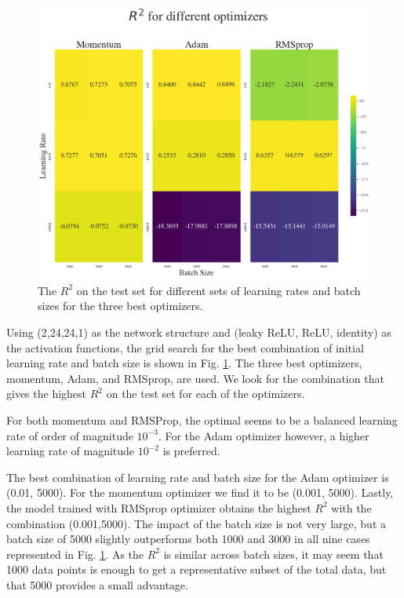 \begin{figure}[h!]
    \centering
    \includegraphics[width=1.0\linewidth]{project_2/figures/r2_grid_final.png}
    \caption{The $R^2$ on the test set for different sets of learning rates and batch sizes for the three best optimizers.}
    \label{fig:grid_franke}
\end{figure}

Using (2,24,24,1) as the network structure and (leaky ReLU, ReLU, identity) as the activation functions, the grid search for the best combination of initial learning rate and batch size is shown in Fig. \ref{fig:grid_franke}. The three best optimizers, momentum, Adam, and RMSprop, are used. 
We look for the combination that gives the highest $R^2$ on the test set for each of the optimizers. 

For both momentum and RMSProp, the optimal seems to be a balanced learning rate of order of magnitude $10^{-3}$.
For the Adam optimizer however, a higher learning rate of magnitude $10^{-2}$ is preferred.

The best combination of learning rate and batch size for the Adam optimizer is (0.01, 5000). For the momentum optimizer we find it to be (0.001, 5000). Lastly, the model trained with RMSprop optimizer obtains the highest $R^2$ with the combination (0.001,5000). 
The impact of the batch size is not very large, but a batch size of 5000 slightly outperforms both 1000 and 3000 in all nine cases represented in Fig. \ref{fig:grid_franke}. 
As the $R^2$ is similar across batch sizes, it may seem that 1000 data points is enough to get a representative subset of the total data, but that 5000 provides a small advantage. 


